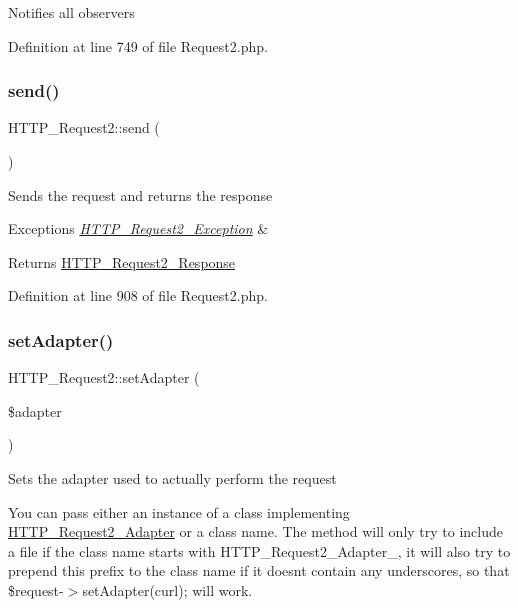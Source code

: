 Notifies all observers 

Definition at line 749 of file Request2.\+php.

\mbox{\label{classHTTP__Request2_a0c8dee043682c61c0f1dc1558ea64d36}} 
\subsubsection{\texorpdfstring{send()}{send()}}
{\footnotesize\ttfamily H\+T\+T\+P\+\_\+\+Request2\+::send (\begin{DoxyParamCaption}{ }\end{DoxyParamCaption})}

Sends the request and returns the response


\begin{DoxyExceptions}{Exceptions}
{\em \hyperlink{classHTTP__Request2__Exception}{H\+T\+T\+P\+\_\+\+Request2\+\_\+\+Exception}} & \\
\hline
\end{DoxyExceptions}
\begin{DoxyReturn}{Returns}
\hyperlink{classHTTP__Request2__Response}{H\+T\+T\+P\+\_\+\+Request2\+\_\+\+Response} 
\end{DoxyReturn}


Definition at line 908 of file Request2.\+php.

\mbox{\label{classHTTP__Request2_a27fadfa673c3317675ab78b5df99264a}} 
\subsubsection{\texorpdfstring{set\+Adapter()}{setAdapter()}}
{\footnotesize\ttfamily H\+T\+T\+P\+\_\+\+Request2\+::set\+Adapter (\begin{DoxyParamCaption}\item[{}]{\$adapter }\end{DoxyParamCaption})}

Sets the adapter used to actually perform the request

You can pass either an instance of a class implementing \hyperlink{classHTTP__Request2__Adapter}{H\+T\+T\+P\+\_\+\+Request2\+\_\+\+Adapter} or a class name. The method will only try to include a file if the class name starts with H\+T\+T\+P\+\_\+\+Request2\+\_\+\+Adapter\+\_\+, it will also try to prepend this prefix to the class name if it doesn\textquotesingle{}t contain any underscores, so that {\ttfamily  \$request-\/$>$set\+Adapter(\textquotesingle{}curl\textquotesingle{}); } will work.


